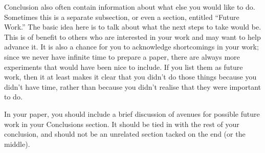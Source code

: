 \documentclass[12pt, letterpaper]{article}
\begin{document}
Conclusion also often contain information about what else you would like
to do.  Sometimes this is a separate subsection, or even a section, entitled
``Future Work.''  The basic idea here is to talk about what the next steps to
take would be.  This is of benefit to others who are interested in your
work and may want to help advance it.  It is also a chance for you to
acknowledge shortcomings in your work; since we never have infinite time to
prepare a paper, there are always more experiments that would have been nice to
include.  If you list them as future work, then it at least makes it clear that
you didn't do those things because you didn't have time, rather than because you
didn't realise that they were important to do.

In your paper, you should include a brief discussion of avenues for possible
future work in your Conclusions section.  It should be tied in with the rest of
your conclusion, and should not be an unrelated section tacked on the end (or
the middle).





\end{document}
